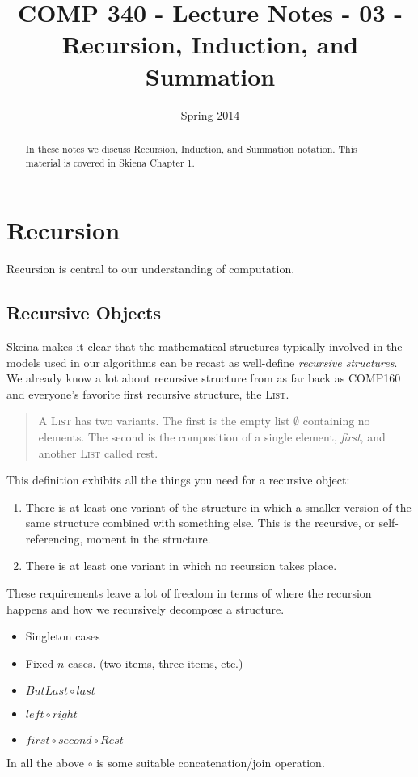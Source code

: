 \documentclass[]{tufte-handout}
\title{COMP 340 - Lecture Notes - 03 - Recursion, Induction, and Summation}
\date{Spring 2014}
\begin{document}
\maketitle

\begin{abstract}
In these notes we discuss Recursion, Induction, and Summation notation. This material is covered in Skiena Chapter 1.
\end{abstract}

\section{Recursion}

Recursion is central to our understanding of computation.  

\subsection{Recursive Objects}

Skeina makes it clear that the mathematical structures typically involved in the models used in our algorithms can be recast as well-define \textit{recursive structures}.  We already know a lot about recursive structure from as far back as COMP160 and everyone's favorite first recursive structure, the \textsc{List}. 
\begin{quote}
A \textsc{List} has two variants. The first is the empty list $\emptyset$ containing no elements. The second is the composition of a single element, \textit{first}, and another \textsc{List} called rest. 
\end{quote}  

This definition exhibits all the things you need for a recursive object:
\begin{enumerate}
\item There is at least one variant of the structure in which a smaller version of the same structure combined with something else. This is the recursive, or self-referencing, moment in the structure.
\item There is at least one variant in which no recursion takes place. 
\end{enumerate}
These requirements leave a lot of freedom in terms of where the recursion happens and how we recursively decompose a structure.  
\begin{itemize}
\item Singleton cases
\item Fixed $n$ cases. (two items, three items, etc.)
\item $ButLast \circ last$ 
\item $left \circ right$ 
\item $first \circ second \circ Rest$
\end{itemize}
In all the above $\circ$ is some suitable concatenation/join operation. 
\end{document}
